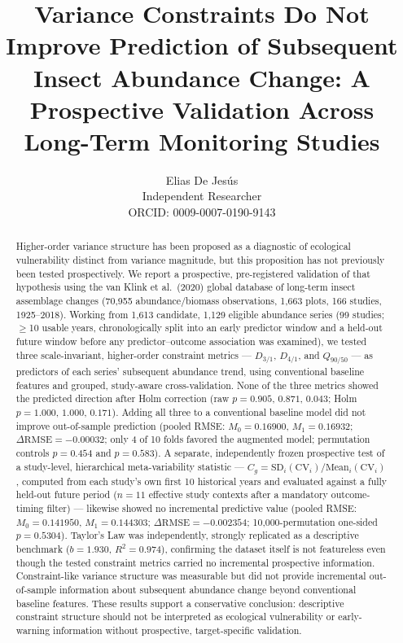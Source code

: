 \documentclass[11pt]{article}
\title{Variance Constraints Do Not Improve Prediction of Subsequent
Insect Abundance Change: A Prospective Validation Across Long-Term
Monitoring Studies}
\author{Elias De Jes\'us \\ Independent Researcher \\ ORCID: 0009-0007-0190-9143}
\date{}
\newcommand{\Dthreeone}{D_{3/1}}
\newcommand{\Dfourone}{D_{4/1}}
\newcommand{\Qninefifty}{Q_{90/50}}
\newcommand{\Cg}{C_g}
\newcommand{\dRMSE}{\Delta\mathrm{RMSE}}
\begin{document}
\maketitle

\begin{abstract}
\noindent Higher-order variance structure has been proposed as a
diagnostic of ecological vulnerability distinct from variance magnitude,
but this proposition has not previously been tested prospectively. We
report a prospective, pre-registered validation of that hypothesis using
the van Klink et al.\ (2020) global database of long-term insect
assemblage changes (70{,}955 abundance/biomass observations, 1{,}663
plots, 166 studies, 1925--2018). Working from 1{,}613 candidate,
1{,}129 eligible abundance series (99 studies; $\geq$10 usable years,
chronologically split into an early predictor window and a held-out
future window before any predictor--outcome association was examined),
we tested three scale-invariant, higher-order constraint metrics ---
$\Dthreeone$, $\Dfourone$, and $\Qninefifty$ --- as predictors of each
series' subsequent abundance trend, using conventional baseline features
and grouped, study-aware cross-validation. None of the three metrics
showed the predicted direction after Holm correction (raw $p=0.905$,
$0.871$, $0.043$; Holm $p=1.000$, $1.000$, $0.171$). Adding all three to
a conventional baseline model did not improve out-of-sample prediction
(pooled RMSE: $M_0=0.16900$, $M_1=0.16932$; $\dRMSE=-0.00032$; only 4 of
10 folds favored the augmented model; permutation controls $p=0.454$ and
$p=0.583$). A separate, independently frozen prospective test of a
study-level, hierarchical meta-variability statistic ---
$\Cg=\mathrm{SD}_i(\mathrm{CV}_i)/\mathrm{Mean}_i(\mathrm{CV}_i)$,
computed from each study's own first 10 historical years and evaluated
against a fully held-out future period ($n=11$ effective study contexts
after a mandatory outcome-timing filter) --- likewise showed no
incremental predictive value (pooled RMSE: $M_0=0.141950$,
$M_1=0.144303$; $\dRMSE=-0.002354$; 10{,}000-permutation one-sided
$p=0.5304$). Taylor's Law was independently, strongly replicated as a
descriptive benchmark ($b=1.930$, $R^2=0.974$), confirming the dataset
itself is not featureless even though the tested constraint metrics
carried no incremental prospective information. Constraint-like variance
structure was measurable but did not provide incremental out-of-sample
information about subsequent abundance change beyond conventional
baseline features. These results support a conservative conclusion:
descriptive constraint structure should not be interpreted as ecological
vulnerability or early-warning information without prospective,
target-specific validation.
\end{abstract}
\end{document}
